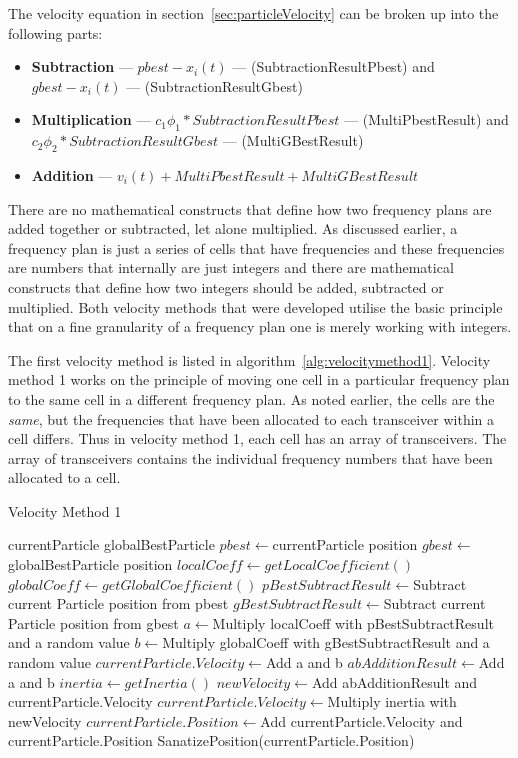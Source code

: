 The velocity equation in section~\ref{sec:particleVelocity} can be broken up into the following parts:
\label{lst:velocitybreakup}
\begin{itemize}
\item \textbf{Subtraction} --- $pbest - x_i(t)$ --- (SubtractionResultPbest) and $gbest - x_i(t)$ --- (SubtractionResultGbest)
\item \textbf{Multiplication} --- $c_1\phi_1 * SubtractionResultPbest$ --- (MultiPbestResult) and $c_2\phi_2 * SubtractionResultGbest$ --- (MultiGBestResult)
\item \textbf{Addition} --- $v_i(t) + MultiPbestResult + MultiGBestResult$
\end{itemize}
There are no mathematical constructs that define how two frequency plans are added together or subtracted, let alone multiplied. As discussed earlier, a frequency plan is just a series of cells that have frequencies and these frequencies are numbers that internally are just integers and there are mathematical constructs that define how two integers should be added, subtracted or multiplied. Both velocity methods that were developed utilise the basic principle that on a fine granularity of a frequency plan one is merely working with integers.


The first velocity method is listed in algorithm~\ref{alg:velocitymethod1}. Velocity method 1 works on the principle of moving one cell in a particular frequency plan to the same cell in a different frequency plan. As noted earlier, the cells are the \emph{same}, but the frequencies that have been allocated to each transceiver within a cell differs. Thus in velocity method 1, each cell has an array of transceivers. The array of transceivers contains the individual frequency numbers that have been allocated to a cell.
\begin{algorithm}[H]
\caption{Velocity Method 1}
\label{alg:velocitymethod1}
	\begin{algorithmic}[1]
	\Require currentParticle
	\Require globalBestParticle
	\State $pbest \leftarrow $currentParticle position
	\State $gbest \leftarrow $globalBestParticle position
	\State $localCoeff \leftarrow getLocalCoefficient()$
	\State $globalCoeff \leftarrow getGlobalCoefficient()$
	\State $pBestSubtractResult \leftarrow $Subtract current Particle position from pbest
	\State $gBestSubtractResult \leftarrow $Subtract current Particle position from gbest
	\State $a \leftarrow $Multiply localCoeff with pBestSubtractResult and a random value
	\State $b \leftarrow $Multiply globalCoeff with gBestSubtractResult and a random value
		\State $currentParticle.Velocity \leftarrow $Add a and b
	\Else
		\State $abAdditionResult \leftarrow $Add a and b
		\State $inertia \leftarrow getInertia()$
		\State $newVelocity \leftarrow $Add abAdditionResult and currentParticle.Velocity
		\State $currentParticle.Velocity \leftarrow $Multiply inertia with newVelocity
	\EndIf
	\State $currentParticle.Position \leftarrow $Add currentParticle.Velocity and currentParticle.Position
	\State SanatizePosition(currentParticle.Position)
	\end{algorithmic}
\end{algorithm}

